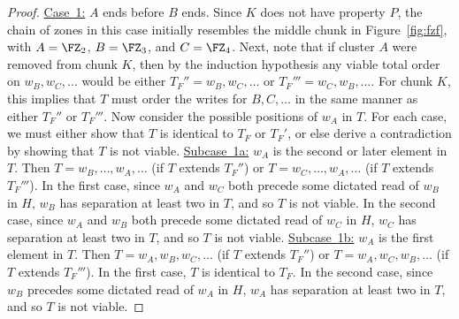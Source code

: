 \begin{lemma}
\begin{proof}
\noindent\underline{Case~1:} $A$ ends before $B$ ends.
Since $K$ does not have property $P$, the chain of zones in this case initially resembles the
middle chunk in Figure~\ref{fig:fzf}, with $A = \FZ_2$, $B = \FZ_3$, and $C = \FZ_4$.
Next, note that if cluster $A$ were removed from chunk $K$, then by the induction hypothesis
any viable total order on $w_B,w_C,\ldots$ would be either $T_F'' = w_B,w_C,\ldots$
or $T_F''' = w_C,w_B,\ldots$.
For chunk $K$, this implies that $T$ must order the writes for $B, C, \ldots$ in the same manner as either $T_F''$ or $T_F'''$.
Now consider the possible positions of $w_A$ in $T$.
For each case, we must either show that $T$ is identical to $T_F$ or $T_F'$, or else derive a contradiction
by showing that $T$ is not viable.
\newline\noindent\underline{Subcase~1a:} $w_A$ is the second or later element in $T$.
Then $T = w_B, \ldots, w_A, \ldots$ (if $T$ extends $T_F''$) or $T = w_C, \ldots, w_A, \ldots$ (if $T$ extends $T_F'''$).
In the first case, since $w_A$ and $w_C$ both precede some dictated read of $w_B$ in $H$,
$w_B$ has separation at least two in $T$, and so $T$ is not viable.
In the second case, since $w_A$ and $w_B$ both precede some dictated read of $w_C$ in $H$,
$w_C$ has separation at least two in $T$, and so $T$ is not viable.
\newline\noindent\underline{Subcase~1b:} $w_A$ is the first element in $T$.
Then $T = w_A, w_B, w_C, \ldots$ (if $T$ extends $T_F''$) or $T = w_A, w_C, w_B, \ldots$ (if $T$ extends $T_F'''$).
In the first case, $T$ is identical to $T_F$.
In the second case, since $w_B$ precedes some dictated read of $w_A$ in $H$,
$w_A$ has separation at least two in $T$, and so $T$ is not viable.


\end{proof}
\end{lemma}
